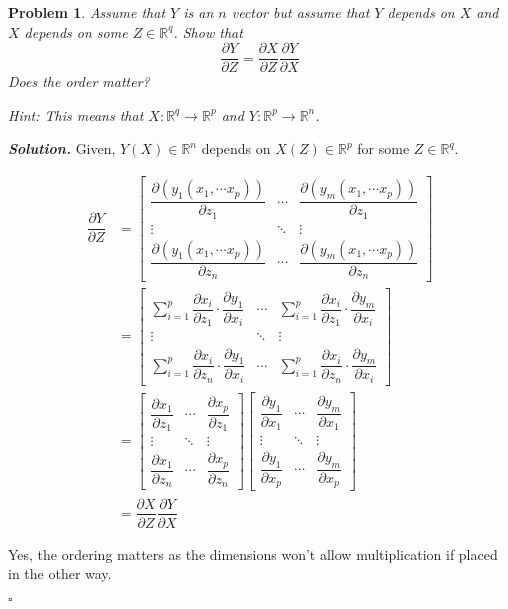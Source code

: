 \documentclass[11pt]{amsart}
\newtheorem{problem}{Problem}
\newenvironment{solution}[1][\it{Solution}]{\textbf{#1. } }{$\square$}
\theoremstyle{definition}
\newcommand{\R}{\mathbb{R}}
\begin{document}
\begin{problem}
 Assume that $Y$ is an $n$ vector but assume that $Y$ depends on $X$ and $X$ depends on
some $Z \in \R^q$. Show that
 $$
 \dfrac{\partial  Y}{\partial Z}= 
  \dfrac{\partial  X}{\partial Z}
   \dfrac{\partial  Y}{\partial X}
 $$
 Does the order matter? 
 
 Hint: This means that $X: \R^q\to \R^p$ and $Y: \R^p\to \R^n$.
 
\end{problem}
\begin{solution}
Given, $Y(X) \in \R^n$ depends on $X(Z) \in \R^p$ for some $Z \in \R^q$.

\begin{align*}
\dfrac{\partial Y}{\partial Z} &= \left[\begin{array}{ccc}\dfrac{\partial \left(y_1(x_1, \cdots x_p)\right)}{\partial z_1} & \cdots & \dfrac{\partial \left(y_m(x_1, \cdots x_p)\right)}{\partial z_1} \\ \vdots & \ddots & \vdots \\ \dfrac{\partial \left(y_1(x_1, \cdots x_p)\right)}{\partial z_n} & \cdots & \dfrac{\partial \left(y_m(x_1, \cdots x_p)\right)}{\partial z_n}\end{array}\right]\\
&= \left[\begin{array}{ccc}\sum_{i=1}^{p}\dfrac{\partial x_i}{\partial z_1} \cdot \dfrac{\partial y_1}{\partial x_i} & \cdots & \sum_{i=1}^{p} \dfrac{\partial x_i}{\partial z_1} \cdot \dfrac{\partial y_m}{\partial x_i} \\ \vdots & \ddots & \vdots \\ \sum_{i=1}^{p} \dfrac{\partial x_i}{\partial z_n} \cdot \dfrac{\partial y_1}{\partial x_i} & \cdots & \sum_{i=1}^{p}\dfrac{\partial x_i}{\partial z_n} \cdot \dfrac{\partial y_m}{\partial x_i}\end{array}\right]\\
&= \left[\begin{array}{ccc}\dfrac{\partial x_1}{\partial z_1} & \cdots & \dfrac{\partial x_p}{\partial z_1} \\ \vdots & \ddots & \vdots \\ \dfrac{\partial x_1}{\partial z_n} & \cdots & \dfrac{\partial x_p}{\partial z_n}\end{array}\right] \left[\begin{array}{ccc}\dfrac{\partial y_1}{\partial x_1} & \cdots & \dfrac{\partial y_m}{\partial x_1} \\ \vdots & \ddots & \vdots \\ \dfrac{\partial y_1}{\partial x_p} & \cdots & \dfrac{\partial y_m}{\partial x_p}\end{array}\right]\\
&=   \dfrac{\partial  X}{\partial Z} \dfrac{\partial  Y}{\partial X}
\end{align*}

Yes, the ordering matters as the dimensions won't allow multiplication if placed in the other way.

\end{solution}
\end{document}
